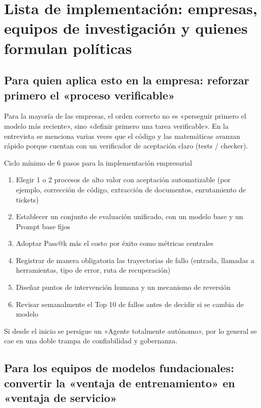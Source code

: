 \section{Lista de implementación: empresas, equipos de investigación y quienes formulan políticas}

\subsection{Para quien aplica esto en la empresa: reforzar primero el «proceso verificable»}

Para la mayoría de las empresas, el orden correcto no es «perseguir primero el modelo más reciente», sino «definir primero una tarea verificable». En la entrevista se menciona varias veces que el código y las matemáticas avanzan rápido porque cuentan con un verificador de aceptación claro (tests / checker).

\begin{importantbox}{Ciclo mínimo de 6 pasos para la implementación empresarial}
\begin{enumerate}
    \item Elegir 1 o 2 procesos de alto valor con aceptación automatizable (por ejemplo, corrección de código, extracción de documentos, enrutamiento de tickets)
    \item Establecer un conjunto de evaluación unificado, con un modelo base y un Prompt base fijos
    \item Adoptar Pass@k más el costo por éxito como métricas centrales
    \item Registrar de manera obligatoria las trayectorias de fallo (entrada, llamadas a herramientas, tipo de error, ruta de recuperación)
    \item Diseñar puntos de intervención humana y un mecanismo de reversión
    \item Revisar semanalmente el Top 10 de fallos antes de decidir si se cambia de modelo
\end{enumerate}

Si desde el inicio se persigue un «Agente totalmente autónomo», por lo general se cae en una doble trampa de confiabilidad y gobernanza.
\end{importantbox}

\subsection{Para los equipos de modelos fundacionales: convertir la «ventaja de entrenamiento» en «ventaja de servicio»}

